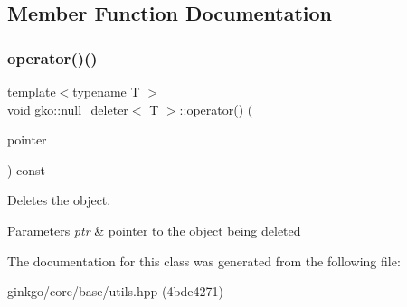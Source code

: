 \subsection{Member Function Documentation}
\mbox{\label{classgko_1_1null__deleter_a09fc153e500a30edaa572f2c6cb674ab}} 
\subsubsection{\texorpdfstring{operator()()}{operator()()}}
{\footnotesize\ttfamily template$<$typename T $>$ \\
void \hyperlink{classgko_1_1null__deleter}{gko\+::null\+\_\+deleter}$<$ T $>$\+::operator() (\begin{DoxyParamCaption}\item[{pointer}]{ }\end{DoxyParamCaption}) const\hspace{0.3cm}{\ttfamily [noexcept]}}



Deletes the object. 


\begin{DoxyParams}{Parameters}
{\em ptr} & pointer to the object being deleted \\
\hline
\end{DoxyParams}


The documentation for this class was generated from the following file\+:\begin{DoxyCompactItemize}
\item 
ginkgo/core/base/utils.\+hpp (4bde4271)\end{DoxyCompactItemize}
